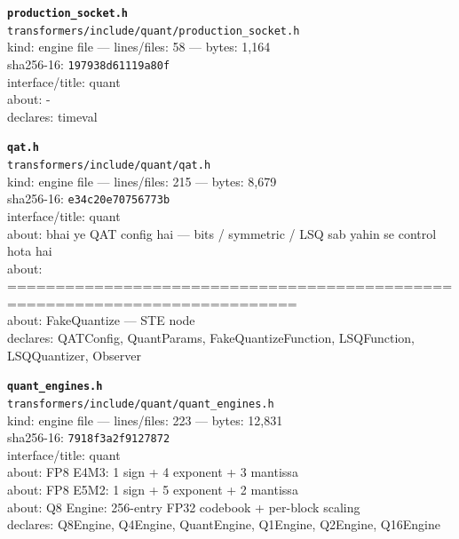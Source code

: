 \noindent\textbf{\texttt{production\_socket.h}}\\
\texttt{transformers/include/quant/production\_socket.h}\\
kind: engine file --- lines/files: 58 --- bytes: 1,164\\
sha256-16: \texttt{197938d61119a80f}\\
interface/title: quant\\
about: -\\
declares: timeval\\
\vspace*{6.0pt}

\noindent\textbf{\texttt{qat.h}}\\
\texttt{transformers/include/quant/qat.h}\\
kind: engine file --- lines/files: 215 --- bytes: 8,679\\
sha256-16: \texttt{e34c20e70756773b}\\
interface/title: quant\\
about: bhai ye QAT config hai — bits / symmetric / LSQ sab yahin se control hota hai\\
about: ============================================================================\\
about: FakeQuantize — STE node\\
declares: QATConfig, QuantParams, FakeQuantizeFunction, LSQFunction, LSQQuantizer, Observer\\
\vspace*{6.0pt}

\noindent\textbf{\texttt{quant\_engines.h}}\\
\texttt{transformers/include/quant/quant\_engines.h}\\
kind: engine file --- lines/files: 223 --- bytes: 12,831\\
sha256-16: \texttt{7918f3a2f9127872}\\
interface/title: quant\\
about: FP8 E4M3: 1 sign + 4 exponent + 3 mantissa\\
about: FP8 E5M2: 1 sign + 5 exponent + 2 mantissa\\
about: Q8 Engine: 256-entry FP32 codebook + per-block scaling\\
declares: Q8Engine, Q4Engine, QuantEngine, Q1Engine, Q2Engine, Q16Engine\\
\vspace*{6.0pt}
\newpage

